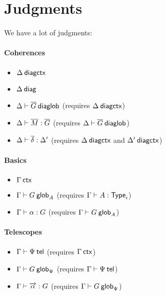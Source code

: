 \section{Judgments}

We have a lot of judgments:

\paragraph{Coherences}

\begin{itemize}
\item ${\Delta} \: \mathsf{diagctx}$
\item $\Delta \: \mathsf{diag}$
\item ${\Delta} \vdash {\ensuremath{\overline{G}}} \: \mathsf{diaglob}$ (requires ${\Delta} \: \mathsf{diagctx}$)
\item ${\Delta} \vdash {\ensuremath{\overline{M}}} : {\overline{G}}$
(requires ${\Delta} \vdash {\ensuremath{\overline{G}}} \: \mathsf{diaglob}$)
\item ${\Delta} \vdash {\ensuremath{\overline{\delta}}} : {\Delta'}$
(requires ${\Delta} \: \mathsf{diagctx}$ and ${\Delta'} \: \mathsf{diagctx}$)
\end{itemize}

\paragraph{Basics}

\begin{itemize}
\item ${\Gamma} \: \mathsf{ctx}$
\item ${\Gamma} \vdash {G} \: \mathsf{glob}_{A}$ (requires ${\Gamma} \vdash {A} : {\mathsf{Type}_{i}}$)
\item ${\Gamma} \vdash {\alpha} : {G}$ (requires ${\Gamma} \vdash {G} \: \mathsf{glob}_{A}$)
\end{itemize}

\paragraph{Telescopes}

\begin{itemize}
\item ${\Gamma} \vdash {\Psi} \: \mathsf{tel}$ (requires ${\Gamma} \: \mathsf{ctx}$)
\item ${\Gamma} \vdash {G} \: \mathsf{glob}_{\Psi}$ (requires ${\Gamma} \vdash {\Psi} \: \mathsf{tel}$)
\item ${\Gamma} \vdash {\ensuremath{\overrightarrow{\alpha}}} : {G}$
(requires ${\Gamma} \vdash {G} \: \mathsf{glob}_{\Psi}$)
\end{itemize}

